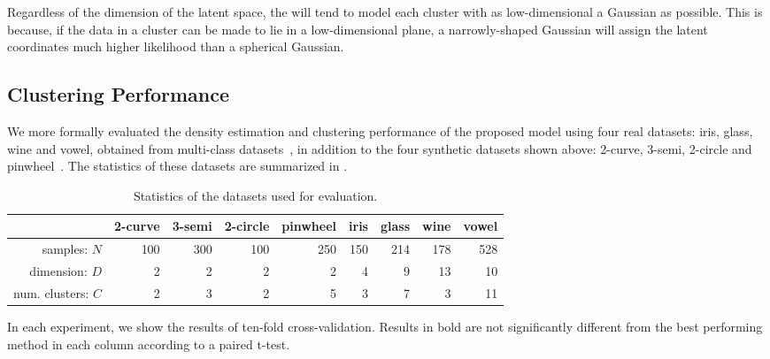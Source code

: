 Regardless of the dimension of the latent space, the \iwmm{} will tend to model each cluster with as low-dimensional a Gaussian as possible. 
This is because, if the data in a cluster can be made to lie in a low-dimensional plane, a narrowly-shaped Gaussian will assign the latent coordinates much higher likelihood than a spherical Gaussian.

\subsection{Clustering Performance}
We more formally evaluated the density estimation and clustering performance of the proposed model using four real datasets: iris, glass, wine and vowel, obtained from \LIBSVM{} multi-class datasets~\citep{chang2011libsvm}, in addition to the four synthetic datasets shown above: 2-curve, 3-semi, 2-circle and pinwheel~\citep{adams2009archipelago}.
The statistics of these datasets are summarized in .
%
\begin{table}[ht!]
\centering
\caption[Datasets used for evaluation of the \siwmm{}]
{Statistics of the datasets used for evaluation.}
\label{tab:statistics}
\begin{tabular}{rrrrrrrrr}
\hline
 & 2-curve & 3-semi & 2-circle & pinwheel & iris & glass  & wine  & vowel  \\
\hline
samples: $N$ & 100 & 300 & 100 & 250 & 150 & 214 & 178 & 528 \\
dimension: $D$ & 2 & 2 & 2 & 2 & 4 & 9 & 13 & 10 \\
num. clusters: $C$ & 2 & 3 & 2 & 5 & 3 & 7 & 3 & 11 \\
\hline
\end{tabular}
\end{table}
%
In each experiment, we show the results of ten-fold cross-validation.
Results in bold are not significantly different from the best performing method in each column according to a paired t-test.
%
%

